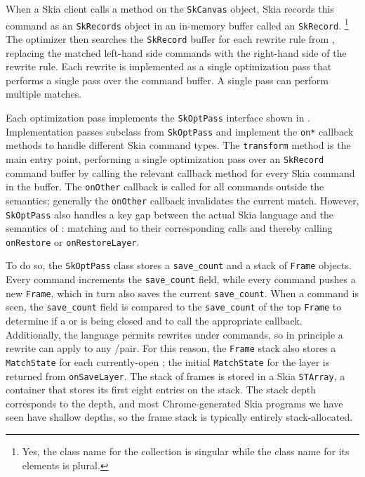 \documentclass[main.tex]{subfiles}
\begin{document}
When a Skia client calls a method on the \texttt{SkCanvas} object,
  Skia records this command
  as an \texttt{SkRecords} object
  in an in-memory buffer
  called an \texttt{SkRecord}.%
\footnote{
Yes, the class name for the collection is singular
  while the class name for its elements is plural.
}
The optimizer then searches the \texttt{SkRecord} buffer
  for each rewrite rule from ,
  replacing the matched left-hand side commands
  with the right-hand side of the rewrite rule.
Each rewrite is implemented as a single optimization pass
  that performs a single pass over the command buffer.
A single pass can perform multiple matches.

Each optimization pass implements
  the \texttt{SkOptPass} interface shown in .
Implementation passes subclass from \texttt{SkOptPass}
  and implement the \texttt{on*} callback methods
  to handle different Skia command types.
The \texttt{transform} method is the main entry point,
  performing a single optimization pass
  over an \texttt{SkRecord} command buffer
  by calling the relevant callback method
  for every Skia command in the buffer.
The \texttt{onOther} callback is called
  for all commands outside the \muskia semantics;
  generally the \texttt{onOther} callback
  invalidates the current match.
However, \texttt{SkOptPass} also handles a key gap between
  the actual Skia language
  and the \muskia semantics of :
  matching \Save and \SaveLayer
  to their corresponding \Restore calls
  and thereby calling \texttt{onRestore} or \texttt{onRestoreLayer}.

To do so, the \texttt{SkOptPass} class stores
  a \texttt{save\_count} and a stack of \texttt{Frame} objects.
Every \Save command increments the \texttt{save\_count} field,
  while every \SaveLayer command pushes a new \texttt{Frame},
  which in turn also saves the current \texttt{save\_count}.
When a \Restore command is seen,
  the \texttt{save\_count} field is compared to
  the \texttt{save\_count} of the top \texttt{Frame}
  to determine if a \Save or \SaveLayer is being closed
  and to call the appropriate callback.
Additionally, the \muskia language permits
  rewrites under \SaveLayer commands,
  so in principle a rewrite can apply to any \SaveLayer/\Restore pair.
For this reason, the \texttt{Frame} stack also stores
  a \texttt{MatchState} for each currently-open \SaveLayer;
  the initial \texttt{MatchState} for the layer
  is returned from \texttt{onSaveLayer}.
The stack of frames is stored in a Skia \texttt{STArray},
  a container that stores its first eight entries on the stack.
The stack depth corresponds to the \SaveLayer depth,
  and most Chrome-generated Skia programs we have seen
  have shallow \SaveLayer depths,
  so the frame stack is typically entirely stack-allocated.
\end{document}
